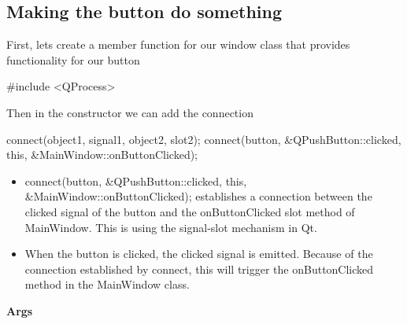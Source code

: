 \documentclass{report}
\begin{document}
    \subsection{Making the button do something}
    \bigbreak \noindent 
    First, lets create a member function for our window class that provides functionality for our button
    \bigbreak \noindent 
    \begin{cppcode}
#include <QProcess>
    \end{cppcode}
    \bigbreak \noindent 
    \pagebreak
    Then in the constructor we can add the connection 
    \bigbreak \noindent 
    \begin{cppcode}
    connect(object1, signal1, object2, slot2);
    connect(button, &QPushButton::clicked, this, &MainWindow::onButtonClicked);
    \end{cppcode}
    \begin{itemize}
        \item connect(button, \&QPushButton::clicked, this, \&MainWindow::onButtonClicked); establishes a connection between the clicked signal of the button and the onButtonClicked slot method of MainWindow. This is using the signal-slot mechanism in Qt.
        \item When the button is clicked, the clicked signal is emitted. Because of the connection established by connect, this will trigger the onButtonClicked method in the MainWindow class.
    \end{itemize}
    \bigbreak \noindent 
    \textbf{Args}
\end{document}

